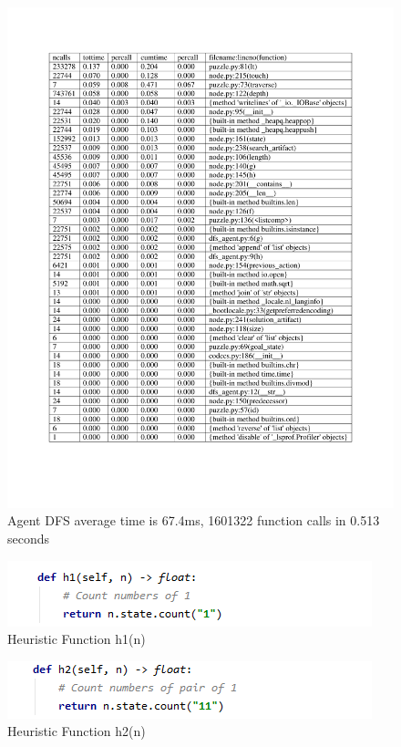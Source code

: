 \begin{figure}[H]
\includegraphics[width=1\linewidth]{assets/Assignment 1 profiling dfs.pdf}
\caption{Agent DFS average time is 67.4ms, 1601322 function calls in 0.513 seconds} \label{dfs profiling}
\end{figure}

\begin{figure}[H]
\includegraphics[width=0.5\linewidth]{assets/h1.PNG}
\caption{Heuristic Function h1(n)} \label{h1 profiling}
\end{figure}

\begin{figure}[H]
\includegraphics[width=0.5\linewidth]{assets/h2.PNG}
\caption{Heuristic Function h2(n)} \label{h2 profiling}
\end{figure}


